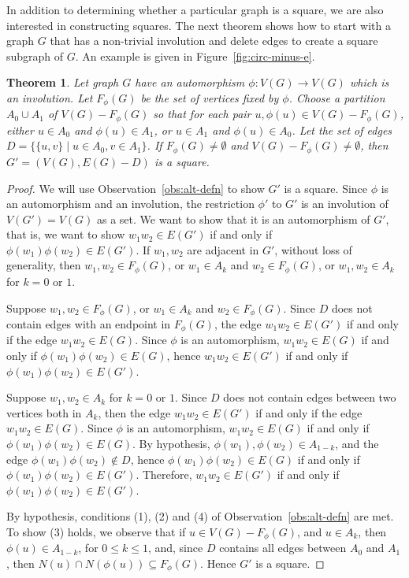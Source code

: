 \documentclass{article}
\newtheorem{theorem}{Theorem}[section]
\theoremstyle{definition}
\begin{document}
In addition to determining whether a particular graph is a square, we are also interested in constructing squares. The next theorem shows how to start with a graph $G$ that has a non-trivial involution and delete edges to create a square subgraph of $G$. An example is given in Figure~\ref{fig:circ-minus-e}.

\begin{theorem} \label{prop:subgraph-e} 
Let graph $G$ have an automorphism $\phi:V(G)\rightarrow V(G)$ which is an involution. Let $F_{\phi}(G)$ be the set of vertices fixed by $\phi$. Choose a partition $A_0\cup A_1$ of $ V(G)- F_{\phi}(G)$ so that for each pair $u, \phi(u)\in V(G)- F_{\phi}(G)$, either $u\in A_0$ and $\phi(u)\in A_1$, or 
$u\in A_1$ and $\phi(u)\in A_0$. Let the set of edges $D=\{\{u,v\}\;|\; u\in A_0, v\in A_1\}$. If $F_{\phi}(G)\neq \emptyset$ and  $V(G)-F_{\phi}(G)\neq \emptyset$, then $G'=(V(G), E(G)-D)$ is a square.
\end{theorem}

\begin{proof}
We will use Observation~\ref{obs:alt-defn} to show $G'$ is a square. Since $\phi$ is an automorphism and an involution, the restriction $\phi'$ to $G'$ is an involution of  $V(G')=V(G)$ as a set. We want to show that it is an automorphism of $G'$, that is, we want to show $w_1w_2\in E(G')$ if and only if $\phi(w_1)\phi(w_2)\in E(G')$. If $w_1, w_2$ are adjacent in $G'$, without loss of generality, then 
$w_1, w_2\in F_{\phi}(G)$, or $w_1\in A_k$ and $w_2\in F_{\phi}(G)$, or $w_1, w_2\in A_k$ for $k=0$ or $1$. 

Suppose $w_1, w_2\in F_{\phi}(G)$, or $w_1\in A_k$ and $w_2\in F_{\phi}(G)$. Since $D$ does not contain edges with an endpoint in $F_{\phi}(G)$, the edge $w_1w_2\in E(G')$ if and only if the edge $w_1w_2\in E(G)$. Since $\phi$ is an automorphism, $w_1w_2\in E(G)$ if and only if $\phi(w_1)\phi(w_2)\in E(G)$, hence 
$w_1w_2\in E(G')$ if and only if $\phi(w_1)\phi(w_2)\in E(G')$.

Suppose $w_1, w_2\in A_k$ for $k=0$ or $1$. Since $D$ does not contain edges between two vertices both in $A_k$, then the edge $w_1w_2\in E(G')$ if and only if the edge $w_1w_2\in E(G)$. Since $\phi$ is an automorphism, $w_1w_2\in E(G)$ if and only if $\phi(w_1)\phi(w_2)\in E(G)$. By hypothesis, $\phi(w_1), \phi(w_2)\in A_{1-k}$, and the edge $\phi(w_1)\phi(w_2)\not \in D$, hence $\phi(w_1)\phi(w_2)\in E(G)$ if and only if $\phi(w_1)\phi(w_2)\in E(G')$. 
Therefore, $w_1w_2\in E(G')$ if and only if $\phi(w_1)\phi(w_2)\in E(G')$.

By hypothesis, conditions (1), (2) and (4) of Observation~\ref{obs:alt-defn} are met. To show (3) holds, we observe that if $u\in V(G)-F_{\phi}(G)$, and $u\in A_k$, then $\phi(u)\in A_{1-k}$, for $0\leq k\leq 1$, and, since $D$ contains all edges between $A_0$ and $A_1$, then $N(u)\cap N(\phi(u))\subseteq F_{\phi}(G)$. 
Hence $G'$ is a square. 
\end{proof}
\end{document}
